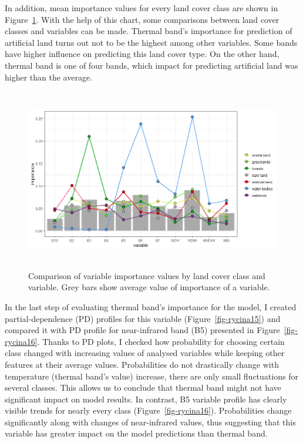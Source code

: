 \documentclass{amuthesis}
\begin{document}
In addition, mean importance values for every land cover class are shown
in Figure~\ref{fig-rycina14a}. With the help of this chart, some
comparisons between land cover classes and variables can be made.
Thermal band's importance for prediction of artificial land turns out
not to be the highest among other variables. Some bands have higher
influence on predicting this land cover type. On the other hand, thermal
band is one of four bands, which impact for predicting artificial land
was higher than the average.

\begin{figure}[H]

{\centering \includegraphics[width=5.53125in,height=3.125in]{./figures/importance_comparison.png}

}

\caption{\label{fig-rycina14a}Comparison of variable importance values
by land cover class and variable. Grey bars show average value of
importance of a variable.}

\end{figure}

In the last step of evaluating thermal band's importance for the model,
I created partial-dependence (PD) profiles for this variable
(Figure~\ref{fig-rycina15}) and compared it with PD profile for
near-infrared band (B5) presented in Figure~\ref{fig-rycina16}. Thanks
to PD plots, I checked how probability for choosing certain class
changed with increasing values of analysed variables while keeping other
features at their average values. Probabilities do not drastically
change with temperature (thermal band's value) increase, there are only
small fluctuations for several classes. This allows us to conclude that
thermal band might not have significant impact on model results. In
contrast, B5 variable profile has clearly visible trends for nearly
every class (Figure~\ref{fig-rycina16}). Probabilities change
significantly along with changes of near-infrared values, thus
suggesting that this variable has greater impact on the model
predictions than thermal band.
\end{document}
